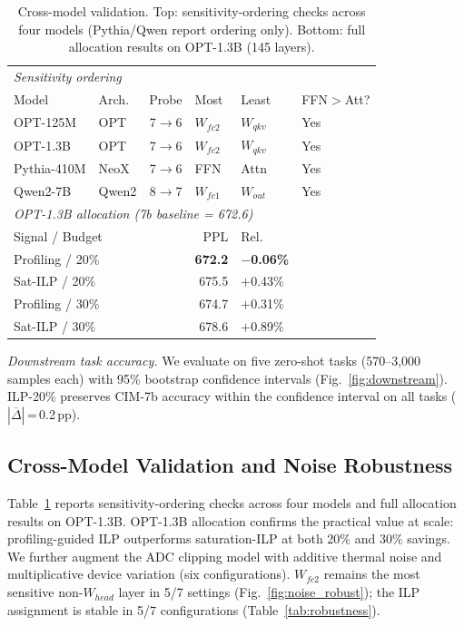 \documentclass[sigconf,review,anonymous]{acmart}
\begin{document}
\begin{table}[t]
\centering
\caption{Cross-model validation. Top: sensitivity-ordering checks across four models (Pythia/Qwen report ordering only). Bottom: full allocation results on OPT-1.3B (145 layers).}
\label{tab:cross_arch}
\footnotesize
\begin{tabular}{llrlll}
\toprule
\multicolumn{6}{l}{\emph{Sensitivity ordering}} \\
Model & Arch. & Probe & Most & Least & FFN$>$Att? \\
\midrule
OPT-125M    & OPT   & 7$\to$6 & $W_{fc2}$ & $W_{qkv}$ & Yes \\
OPT-1.3B    & OPT   & 7$\to$6 & $W_{fc2}$ & $W_{qkv}$ & Yes \\
Pythia-410M & NeoX  & 7$\to$6 & FFN       & Attn      & Yes \\
Qwen2-7B    & Qwen2 & 8$\to$7 & $W_{fc1}$ & $W_{out}$ & Yes \\
\midrule
\multicolumn{6}{l}{\emph{OPT-1.3B allocation (7b baseline = 672.6)}} \\
\multicolumn{3}{l}{Signal / Budget} & \multicolumn{1}{r}{PPL} & \multicolumn{1}{l}{Rel.} & \\
\midrule
\multicolumn{3}{l}{Profiling / 20\%} & \multicolumn{1}{r}{\textbf{672.2}} & \multicolumn{1}{l}{\textbf{$-$0.06\%}} & \\
\multicolumn{3}{l}{Sat-ILP / 20\%}   & \multicolumn{1}{r}{675.5} & \multicolumn{1}{l}{$+$0.43\%} & \\
\multicolumn{3}{l}{Profiling / 30\%} & \multicolumn{1}{r}{674.7} & \multicolumn{1}{l}{$+$0.31\%} & \\
\multicolumn{3}{l}{Sat-ILP / 30\%}   & \multicolumn{1}{r}{678.6} & \multicolumn{1}{l}{$+$0.89\%} & \\
\bottomrule
\end{tabular}
\end{table}

\textit{Downstream task accuracy.}
We evaluate on five zero-shot tasks (570--3{,}000 samples each) with 95\% bootstrap confidence intervals (Fig.~\ref{fig:downstream}).
ILP-20\% preserves CIM-7b accuracy within the confidence interval on all tasks ($|\overline{\Delta}|$\,=\,0.2\,pp).

\subsection{Cross-Model Validation and Noise Robustness}

Table~\ref{tab:cross_arch} reports sensitivity-ordering checks across four models and full allocation results on OPT-1.3B.
OPT-1.3B allocation confirms the practical value at scale: profiling-guided ILP outperforms saturation-ILP at both 20\% and 30\% savings.
We further augment the ADC clipping model with additive thermal noise and multiplicative device variation (six configurations).
$W_{fc2}$ remains the most sensitive non-$W_{head}$ layer in 5/7 settings (Fig.~\ref{fig:noise_robust}); the ILP assignment is stable in 5/7 configurations (Table~\ref{tab:robustness}).
\end{document}
